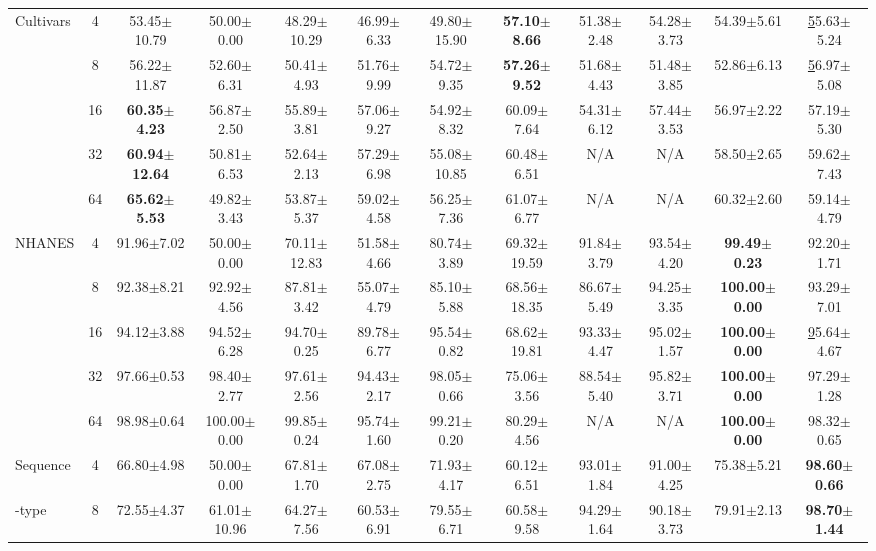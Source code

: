 \documentclass{article}
\theoremstyle{plain}
\theoremstyle{definition}
\theoremstyle{remark}
\begin{document}
\begin{table}[h!]
{\begin{tabular}{@{}lccccccccccc@{}}
Cultivars & 4 & 53.45$\pm$10.79 & 50.00$\pm$0.00 & 48.29$\pm$10.29 & 46.99$\pm$6.33 & 49.80$\pm$15.90 & \textbf{57.10$\pm$8.66} & 51.38$\pm$2.48 & 54.28$\pm$3.73 & 54.39$\pm$5.61 & {\ul 55.63$\pm$5.24} \\
 & 8 & 56.22$\pm$11.87 & 52.60$\pm$6.31 & 50.41$\pm$4.93 & 51.76$\pm$9.99 & 54.72$\pm$9.35 & \textbf{57.26$\pm$9.52} & 51.68$\pm$4.43 & 51.48$\pm$3.85 & 52.86$\pm$6.13 & {\ul 56.97$\pm$5.08} \\
 & 16 & \textbf{60.35$\pm$4.23} & 56.87$\pm$2.50 & 55.89$\pm$3.81 & 57.06$\pm$9.27 & 54.92$\pm$8.32 & 60.09$\pm$7.64 & 54.31$\pm$6.12 & 57.44$\pm$3.53 & 56.97$\pm$2.22 & 57.19$\pm$5.30 \\
 & 32 & \textbf{60.94$\pm$12.64} & 50.81$\pm$6.53 & 52.64$\pm$2.13 & 57.29$\pm$6.98 & 55.08$\pm$10.85 & 60.48$\pm$6.51 & N/A & N/A & 58.50$\pm$2.65 & 59.62$\pm$7.43 \\
 & 64 & \textbf{65.62$\pm$5.53} & 49.82$\pm$3.43 & 53.87$\pm$5.37 & 59.02$\pm$4.58 & 56.25$\pm$7.36 & 61.07$\pm$6.77 & N/A & N/A & 60.32$\pm$2.60 & 59.14$\pm$4.79 \\ \hline
NHANES & 4 & 91.96$\pm$7.02 & 50.00$\pm$0.00 & 70.11$\pm$12.83 & 51.58$\pm$4.66 & 80.74$\pm$3.89 & 69.32$\pm$19.59 & 91.84$\pm$3.79 & 93.54$\pm$4.20 & \textbf{99.49$\pm$0.23} & 92.20$\pm$1.71 \\
 & 8 & 92.38$\pm$8.21 & 92.92$\pm$4.56 & 87.81$\pm$3.42 & 55.07$\pm$4.79 & 85.10$\pm$5.88 & 68.56$\pm$18.35 & 86.67$\pm$5.49 & 94.25$\pm$3.35 & \textbf{100.00$\pm$0.00} & 93.29$\pm$7.01 \\
 & 16 & 94.12$\pm$3.88 & 94.52$\pm$6.28 & 94.70$\pm$0.25 & 89.78$\pm$6.77 & 95.54$\pm$0.82 & 68.62$\pm$19.81 & 93.33$\pm$4.47 & 95.02$\pm$1.57 & \textbf{100.00$\pm$0.00} & {\ul 95.64$\pm$4.67} \\
 & 32 & 97.66$\pm$0.53 & 98.40$\pm$2.77 & 97.61$\pm$2.56 & 94.43$\pm$2.17 & 98.05$\pm$0.66 & 75.06$\pm$3.56 & 88.54$\pm$5.40 & 95.82$\pm$3.71 & \textbf{100.00$\pm$0.00} & 97.29$\pm$1.28 \\
 & 64 & 98.98$\pm$0.64 & 100.00$\pm$0.00 & 99.85$\pm$0.24 & 95.74$\pm$1.60 & 99.21$\pm$0.20 & 80.29$\pm$4.56 & N/A & N/A & \textbf{100.00$\pm$0.00} & 98.32$\pm$0.65 \\ \hline
Sequence & 4 & 66.80$\pm$4.98 & 50.00$\pm$0.00 & 67.81$\pm$1.70 & 67.08$\pm$2.75 & 71.93$\pm$4.17 & 60.12$\pm$6.51 & 93.01$\pm$1.84 & 91.00$\pm$4.25 & 75.38$\pm$5.21 & \textbf{98.60$\pm$0.66} \\
-type & 8 & 72.55$\pm$4.37 & 61.01$\pm$10.96 & 64.27$\pm$7.56 & 60.53$\pm$6.91 & 79.55$\pm$6.71 & 60.58$\pm$9.58 & 94.29$\pm$1.64 & 90.18$\pm$3.73 & 79.91$\pm$2.13 & \textbf{98.70$\pm$1.44} \\

\end{tabular}}
\end{table}
\end{document}
